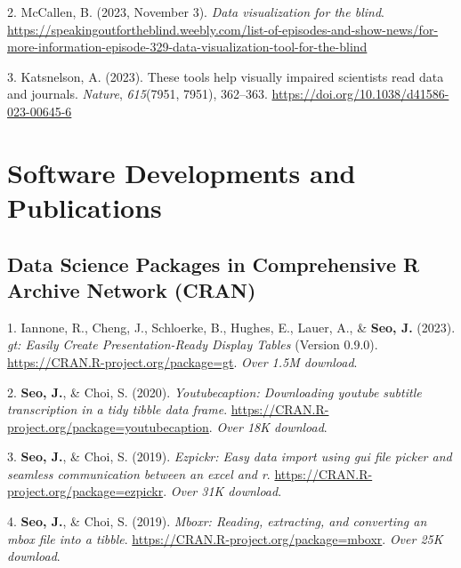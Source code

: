 \documentclass[11pt,a4paper,]{awesome-cv}
\begin{document}
\leavevmode\hypertarget{ref-mccallen2023data}{}%
2. McCallen, B. (2023, November 3). \emph{Data visualization for the
  blind}.
\url{https://speakingoutfortheblind.weebly.com/list-of-episodes-and-show-news/for-more-information-episode-329-data-visualization-tool-for-the-blind}

\leavevmode\hypertarget{ref-katsnelsonTheseToolsHelp2023}{}%
3. Katsnelson, A. (2023). These tools help visually impaired scientists
read data and journals. \emph{Nature}, \emph{615}(7951, 7951), 362--363.
\url{https://doi.org/10.1038/d41586-023-00645-6}

\hypertarget{software-developments-and-publications}{%
  \section{Software Developments and
    Publications}\label{software-developments-and-publications}}

\hypertarget{data-science-packages-in-comprehensive-r-archive-network-cran}{%
  \subsection{Data Science Packages in Comprehensive R Archive Network
    (CRAN)}\label{data-science-packages-in-comprehensive-r-archive-network-cran}}

\hypertarget{bibliography}{}
\leavevmode\hypertarget{ref-Iannone_gt_Easily_Create}{}%
1. Iannone, R., Cheng, J., Schloerke, B., Hughes, E., Lauer, A., \&
\textbf{Seo, J.} (2023). \emph{gt: Easily Create Presentation-Ready
  Display Tables} (Version 0.9.0).
\url{https://CRAN.R-project.org/package=gt}. \emph{Over 1.5M download}.

\leavevmode\hypertarget{ref-R-youtubecaption}{}%
2. \textbf{Seo, J.}, \& Choi, S. (2020). \emph{Youtubecaption:
  Downloading youtube subtitle transcription in a tidy tibble data frame}.
\url{https://CRAN.R-project.org/package=youtubecaption}. \emph{Over 18K
  download}.

\leavevmode\hypertarget{ref-R-ezpickr}{}%
3. \textbf{Seo, J.}, \& Choi, S. (2019). \emph{Ezpickr: Easy data import
  using gui file picker and seamless communication between an excel and
  r}. \url{https://CRAN.R-project.org/package=ezpickr}. \emph{Over 31K
  download}.

\leavevmode\hypertarget{ref-R-mboxr}{}%
4. \textbf{Seo, J.}, \& Choi, S. (2019). \emph{Mboxr: Reading,
  extracting, and converting an mbox file into a tibble}.
\url{https://CRAN.R-project.org/package=mboxr}. \emph{Over 25K
  download}.
\end{document}
